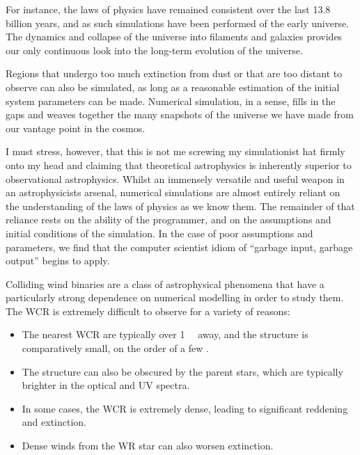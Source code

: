 For instance, the laws of physics have remained consistent over the last 13.8 billion years, and as such simulations have been performed of the early universe.
The dynamics and collapse of the universe into filaments and galaxies provides our only continuous look into the long-term evolution of the universe.

Regions that undergo too much extinction from dust or that are too distant to observe can also be simulated, as long as a reasonable estimation of the initial system parameters can be made.
Numerical simulation, in a sense, fills in the gaps and weaves together the many snapshots of the universe we have made from our vantage point in the cosmos.

I must stress, however, that this is not me screwing my simulationist hat firmly onto my head and claiming that theoretical astrophysics is inherently superior to observational astrophysics.
Whilst an immensely versatile and useful weapon in an astrophysicists arsenal, numerical simulations are almost entirely reliant on the understanding of the laws of physics as we know them.
The remainder of that reliance rests on the ability of the programmer, and on the assumptions and initial conditions of the simulation.
In the case of poor assumptions and parameters, we find that the computer scientist idiom of ``garbage input, garbage output'' begins to apply.


Colliding wind binaries are a class of astrophysical phenomena that have a particularly strong dependence on numerical modelling in order to study them.
The WCR is extremely difficult to observe for a variety of reasons:

\begin{itemize}
  \item The nearest WCR are typically over \SI{1}{\kilo\parsec} away, and the structure is comparatively small, on the order of a few \si{\au}.
  \item The structure can also be obscured by the parent stars, which are typically brighter in the optical and UV spectra.
  \item In some cases, the WCR is extremely dense, leading to significant reddening and extinction.
  \item Dense winds from the WR star can also worsen extinction.
\end{itemize}

